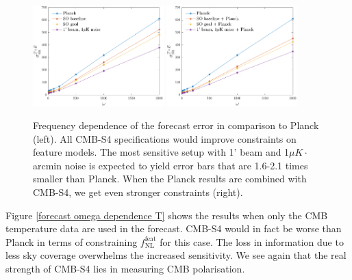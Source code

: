 \begin{figure}[ht]
	\centering
	\includegraphics[width=0.45\textwidth]{omega_dependence_pol.pdf}
	\includegraphics[width=0.45\textwidth]{omega_dependence_combined_pol.pdf}
	\caption{Frequency dependence of the forecast error in comparison to Planck (left). All CMB-S4 specifications would improve constraints on feature models. The most sensitive setup with 1' beam and 1$\mu K \cdot$arcmin noise is expected to yield error bars that are 1.6-2.1 times smaller than Planck. When the Planck results are combined with CMB-S4, we get even stronger constraints (right).}
	\label{forecast omega dependence pol}
\end{figure}

Figure \ref{forecast omega dependence T} shows the results when only the CMB temperature data are used in the forecast. CMB-S4 would in fact be worse than Planck in terms of constraining $f_\text{NL}^\text{feat}$ for this case. The loss in information due to less sky coverage overwhelms the increased sensitivity. We see again that the real strength of CMB-S4 lies in measuring CMB polarisation.

